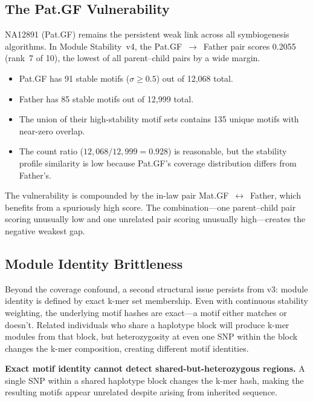 \documentclass{../yalumba}
\begin{document}
\subsection{The Pat.GF Vulnerability}

NA12891 (Pat.GF) remains the persistent weak link across all symbiogenesis
algorithms.  In Module Stability~v4, the Pat.GF~$\to$~Father pair scores
0.2055 (rank~7 of 10), the lowest of all parent--child pairs by a wide margin.

\begin{itemize}
  \item Pat.GF has 91 stable motifs ($\sigma \geq 0.5$) out of 12{,}068 total.
  \item Father has 85 stable motifs out of 12{,}999 total.
  \item The union of their high-stability motif sets contains 135 unique motifs
    with near-zero overlap.
  \item The count ratio ($12{,}068 / 12{,}999 = 0.928$) is reasonable, but the
    stability profile similarity is low because Pat.GF's coverage
    distribution differs from Father's.
\end{itemize}


The vulnerability is compounded by the in-law pair
Mat.GF~$\leftrightarrow$~Father, which benefits from a spuriously high score.
The combination---one parent--child pair scoring unusually low and one
unrelated pair scoring unusually high---creates the negative weakest gap.

\subsection{Module Identity Brittleness}

Beyond the coverage confound, a second structural issue persists from v3:
module identity is defined by exact k-mer set membership.  Even with continuous
stability weighting, the underlying motif hashes are exact---a motif either
matches or doesn't.  Related individuals who share a haplotype block will
produce k-mer modules from that block, but heterozygosity at even one SNP
within the block changes the k-mer composition, creating different motif
identities.

\begin{limitation}
\textbf{Exact motif identity cannot detect shared-but-heterozygous regions.}
A single SNP within a shared haplotype block changes the k-mer hash, making
the resulting motifs appear unrelated despite arising from inherited sequence.
\end{limitation}
\end{document}
